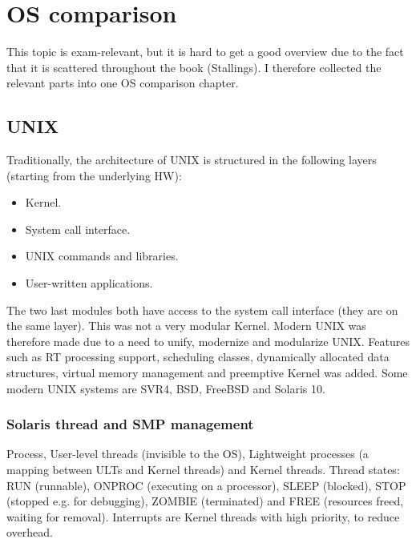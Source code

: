 \chapter{OS comparison}

This topic is exam-relevant, but it is hard to get a good overview due to the fact that it is scattered throughout the book (Stallings). I therefore collected the relevant parts into one OS comparison chapter.

\section{UNIX}
Traditionally, the architecture of UNIX is structured in the following layers (starting from the underlying HW): \begin{itemize}
    \item Kernel.
    \item System call interface.
    \item UNIX commands and libraries.
    \item User-written applications.
\end{itemize}
The two last modules both have access to the system call interface (they are on the same layer). This was not a very modular Kernel. Modern UNIX was therefore made due to a need to unify, modernize and modularize UNIX. Features such as RT processing support, scheduling classes, dynamically allocated data structures, virtual memory management and preemptive Kernel was added. Some modern UNIX systems are SVR4, BSD, FreeBSD and Solaris 10.

\subsection{Solaris thread and SMP management}
Process, User-level threads (invisible to the OS), Lightweight processes (a mapping between ULTs and Kernel threads) and Kernel threads. Thread states: RUN (runnable), ONPROC (executing on a processor), SLEEP (blocked), STOP (stopped e.g. for debugging), ZOMBIE (terminated) and FREE (resources freed, waiting for removal). Interrupts are Kernel threads with high priority, to reduce overhead.

